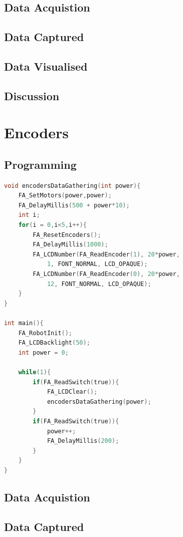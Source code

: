 \documentclass[11pt,a4paper,titlepage]{article}
\begin{document}
\subsection{Data Acquistion}
\subsection{Data Captured}
\subsection{Data Visualised}

\subsection{Discussion}

\section{Encoders}
\subsection{Programming}
\begin{lstlisting}[language=C,frame=single]
void encodersDataGathering(int power){
	FA_SetMotors(power,power);
	FA_DelayMillis(500 + power*10);
	int i;
	for(i = 0,i<5,i++){
		FA_ResetEncoders();
		FA_DelayMillis(1000);
		FA_LCDNumber(FA_ReadEncoder(1), 20*power, 
			1, FONT_NORMAL, LCD_OPAQUE);
		FA_LCDNumber(FA_ReadEncoder(0), 20*power, 
			12, FONT_NORMAL, LCD_OPAQUE);
	}
}

int main(){
	FA_RobotInit();
	FA_LCDBacklight(50);
	int power = 0;
	
	while(1){  
		if(FA_ReadSwitch(true)){
			FA_LCDClear();
			encodersDataGathering(power);
		}
		if(FA_ReadSwitch(true)){
			power++;
			FA_DelayMillis(200);
		}
	}
}

\end{lstlisting}
\subsection{Data Acquistion}
\subsection{Data Captured}
\end{document}
